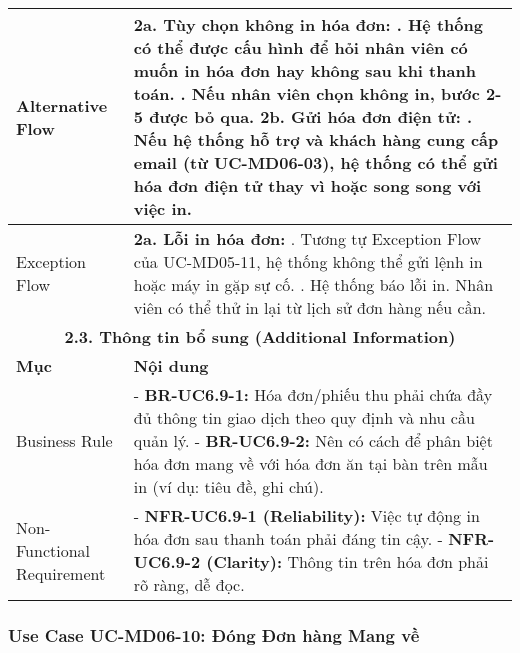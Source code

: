 \begin{longtable}{|m{4cm}|p{11cm}|}
\hline
Alternative Flow & \textbf{2a. Tùy chọn không in hóa đơn:} \newline    1. Hệ thống có thể được cấu hình để hỏi nhân viên có muốn in hóa đơn hay không sau khi thanh toán. \newline    2. Nếu nhân viên chọn không in, bước 2-5 được bỏ qua. \newline \textbf{2b. Gửi hóa đơn điện tử:} \newline    1. Nếu hệ thống hỗ trợ và khách hàng cung cấp email (từ UC-MD06-03), hệ thống có thể gửi hóa đơn điện tử thay vì hoặc song song với việc in. \\
\hline
Exception Flow & \textbf{2a. Lỗi in hóa đơn:} \newline    1. Tương tự Exception Flow của UC-MD05-11, hệ thống không thể gửi lệnh in hoặc máy in gặp sự cố. \newline    2. Hệ thống báo lỗi in. Nhân viên có thể thử in lại từ lịch sử đơn hàng nếu cần. \\
\hline
\multicolumn{2}{|c|}{\textbf{2.3. Thông tin bổ sung (Additional Information)}} \\
\hline
\textbf{Mục} & \textbf{Nội dung} \\
\hline
Business Rule & - \textbf{BR-UC6.9-1:} Hóa đơn/phiếu thu phải chứa đầy đủ thông tin giao dịch theo quy định và nhu cầu quản lý. \newline - \textbf{BR-UC6.9-2:} Nên có cách để phân biệt hóa đơn mang về với hóa đơn ăn tại bàn trên mẫu in (ví dụ: tiêu đề, ghi chú). \\
\hline
Non-Functional Requirement & - \textbf{NFR-UC6.9-1 (Reliability):} Việc tự động in hóa đơn sau thanh toán phải đáng tin cậy. \newline - \textbf{NFR-UC6.9-2 (Clarity):} Thông tin trên hóa đơn phải rõ ràng, dễ đọc. \\
\hline
\end{longtable}

\subsubsection{Use Case UC-MD06-10: Đóng Đơn hàng Mang về}

